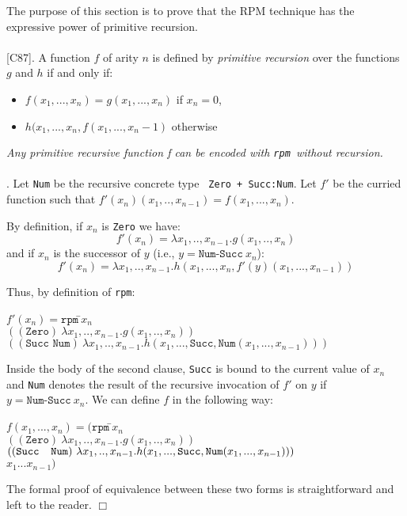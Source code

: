 \documentclass[a4paper,11pt]{article}
\newcommand{\rpm}{\texttt{rpm}}
\newcommand{\QED}{\hfill\(\Box\)}
\begin{document}
The purpose of this section is to prove that the RPM technique 
has the expressive power of primitive recursion.
~~~\\
~~~\\
 [C87]. A function $f$ of arity $n$ is
defined by \emph{primitive recursion} over the functions $g$ and $h$ if
and only if: 
\begin{itemize}
\item $f(x_1,...,x_ n) = g(x_1,...,x_n)$ if $x_n = 0$,
\item $h(x_1,...,x_n,f(x_1,...,x_n-1)$ otherwise
\end{itemize}

 \emph{Any primitive recursive function f can be
encoded with \rpm\ without recursion.}
~~\\
~~\\
. Let \texttt{Num} be the recursive concrete type {\tt
Zero + Succ:Num}.
Let $f'$ be the curried function such that
$f'(x_n)(x_1,..,x_{n-1}) = f(x_1,...,x_n)$.

By definition, if $x_n$ is \texttt{Zero} we have:
\[f'(x_n) = \lambda x_1,..,x_{n-1} . g(x_1,..,x_n)\]
and if $x_n$ is the successor of $y$ (i.e., $y = \texttt{Num-Succ}~ x_n$):
\[f'(x_n) = \lambda x_1,..,x_{n-1} . h(x_1,...,x_n,f'(y)(x_1,...,x_{n-1})) \]

Thus, by definition of \rpm:
\begin{tabbing}
$f'(x_n) = \rpm~$\=$x_n$ \\
        \>$((\texttt{Zero})~ \lambda x_1,..,x_{n-1} .
                                g(x_1,..,x_n))$ \\
        \>$((\texttt{Succ~Num})~ \lambda x_1,..,x_{n-1} .
                        h(x_1,...,\texttt{Succ},\texttt{Num}(x_1,...,x_{n-1})))$
\end{tabbing}
Inside the body of the second clause, \texttt{Succ} is bound to the
current value of $x_n$ and \texttt{Num} denotes the result of the
recursive invocation of $f'$ on $y$ if $y = \texttt{Num-Succ}~x_n$.
We can define $f$ in the following way:
\begin{tabbing}
$f(x_1,...,x_n) = (\rpm~$\=$x_n$ \\
                \>$((\texttt{Zero})~ \lambda x_1,..,x_{n-1} .
                                g(x_1,..,x_n))$ \\
                \>$((\texttt{Succ~ Num})~ \lambda x_1,..,x_{n-1} .
                                h(x_1,...,\texttt{Succ},{\tt
                                        Num}(x_1,...,x_{n-1})))$ \\
                \> $x_1 ... x_{n-1})$
\end{tabbing}
The formal proof of equivalence between these two forms is
straightforward and left to the reader. \QED
\end{document}
